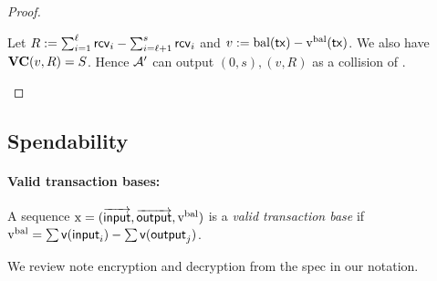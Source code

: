 \documentclass[11pt]{article}
\numberwithin{equation}{section} %
\numberwithin{figure}{section} %
\begin{document}
\begin{proof}
\begin{enumerate}
Let $R:= \sum_{i=1}^{\ell} \mathsf{rcv}_i-\sum_{i=\ell+1}^{s} \mathsf{rcv}_i$  and $v:= \mathrm{bal}(\mathsf{tx})-\mathrm{v^{bal}}(\mathsf{tx})$.
We also have $\mathbf{VC}(v,R) = S$.
Hence ${\mathcal A}'$ can output $(0,s), (v,R)$ as a collision of \valcom.

\end{enumerate}

 \end{proof}
 
\subsection{Spendability}

\paragraph{Valid transaction bases:}
A sequence $\mathrm{x} = (\overrightarrow{\mathsf{input}},\overrightarrow{\mathsf{output}},\mathrm{v^{bal}})$ is
a \emph{valid transaction base} if $\mathrm{v^{bal}} =  \sum \mathsf{v}(\mathsf{input}_i) - \sum \mathsf{v}(\mathsf{output}_j)$.

We review note encryption and decryption from the spec in our notation.

\end{document}
